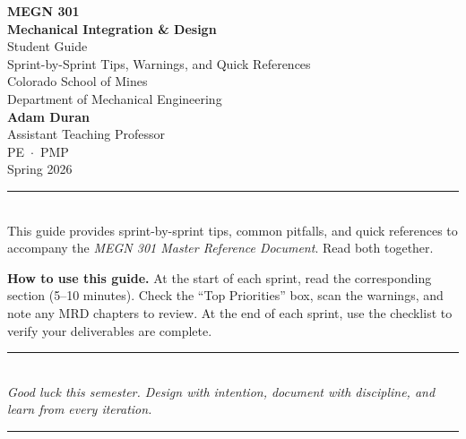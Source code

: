 \documentclass[11pt,letterpaper]{article}
\begin{document}

\begin{center}
    \vspace*{0.5cm}
    {\Huge\bfseries\sffamily\textcolor{MinesBlue}{MEGN 301}}\\[0.3cm]
    {\Huge\bfseries\sffamily\textcolor{MinesBlue}{Mechanical Integration \& Design}}\\[1cm]
    {\huge\sffamily\textcolor{MinesBlue}{Student Guide}}\\[0.6cm]
    {\Large\sffamily Sprint-by-Sprint Tips, Warnings, and Quick References}\\[1.5cm]
    {\large\sffamily\textcolor{MinesSilver}{Colorado School of Mines}}\\[0.2cm]
    {\large\sffamily\textcolor{MinesSilver}{Department of Mechanical Engineering}}\\[1cm]
    {\Large\sffamily\textbf{Adam Duran}}\\[0.2cm]
    {\normalsize\sffamily Assistant Teaching Professor}\\[0.2cm]
    {\normalsize\sffamily\textcolor{MinesSilver}{PE \,$\cdot$\, PMP}}\\[1cm]
    {\normalsize\sffamily\textcolor{MinesSilver}{Spring 2026}}\\[0.5cm]
    \textcolor{MinesBlue}{\rule{0.6\textwidth}{1pt}}\\[0.3cm]
    {\small\sffamily This guide provides sprint-by-sprint tips, common pitfalls, and quick references to accompany the \textit{MEGN 301 Master Reference Document}. Read both together.}
\end{center}
\vspace{1cm}

\begin{protip}
\textbf{How to use this guide.} At the start of each sprint, read the corresponding section (5--10 minutes). Check the ``Top Priorities'' box, scan the warnings, and note any MRD chapters to review. At the end of each sprint, use the checklist to verify your deliverables are complete.
\end{protip}

\tableofcontents
\newpage















\vspace{1cm}
\begin{center}
\textcolor{MinesBlue}{\rule{0.4\textwidth}{1pt}}\\[6pt]
\textit{Good luck this semester. Design with intention, document with discipline, and learn from every iteration.}\\[6pt]
\textcolor{MinesBlue}{\rule{0.4\textwidth}{1pt}}
\end{center}
\end{document}

